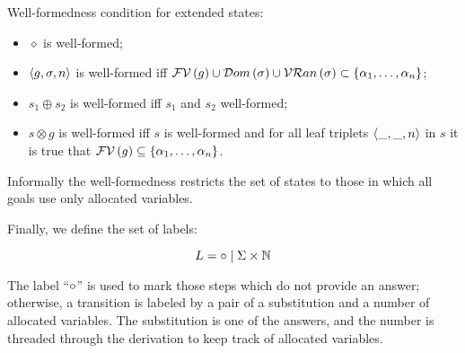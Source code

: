 \begin{definition}
  Well-formedness condition for extended states:
  
  \begin{itemize}
  \item $\diamond$ is well-formed;
  \item $\left<{g, \sigma, n}\right>$ is well-formed iff $\mathcal{FV}\,({g})\cup\mathcal{D}om\,({\sigma})\cup\mathcal{VR}an\,({\sigma})\subset\{\alpha_1,\dots,\alpha_n\}$;
  \item $s_1\oplus s_2$ is well-formed iff $s_1$ and $s_2$ well-formed;
  \item $s\otimes g$ is well-formed iff $s$ is well-formed and for all leaf triplets $\left<{\_,\_,n}\right>$ in $s$ it is true that $\mathcal{FV}\,({g})\subseteq\{\alpha_1,\dots,\alpha_n\}$.
  \end{itemize}
  
\end{definition}

Informally the well-formedness restricts the set of states to those in which all goals use only allocated variables.

Finally, we define the set of labels:

\[
L = \circ \mid \Sigma\times \mathbb{N}
\]

The label ``$\circ$'' is used to mark those steps which do not provide an answer; otherwise, a transition is labeled by a pair of a substitution and a number of allocated
variables. The substitution is one of the answers, and the number is threaded through the derivation to keep track of allocated variables.

